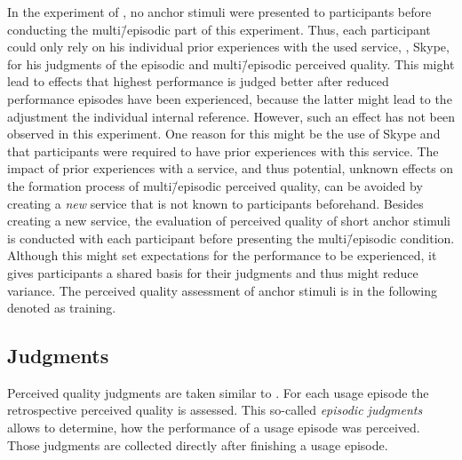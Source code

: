 In the experiment of \citet{moller_single-call_2011}, no anchor stimuli were presented to participants before conducting the multi\=/episodic part of this experiment.
Thus, each participant could only rely on his individual prior experiences with the used service, \ie, Skype, for his judgments of the episodic and multi\=/episodic perceived quality.
This might lead to effects that highest performance is judged better after reduced performance episodes have been experienced, because the latter might lead to the adjustment the individual internal reference.
However, such an effect has not been observed in this experiment.
One reason for this might be the use of Skype and that participants were required to have prior experiences with this service.
The impact of prior experiences with a service, and thus potential, unknown effects on the formation process of multi\=/episodic perceived quality, can be avoided by creating a \emph{new} service that is not known to participants beforehand.
Besides creating a new service, the evaluation of perceived quality of short anchor stimuli is conducted with each participant before presenting the multi\=/episodic condition.
Although this might set expectations for the performance to be experienced, it gives participants a shared basis for their judgments and thus might reduce variance.
The perceived quality assessment of anchor stimuli is in the following denoted as training.


\subsection{Judgments}
Perceived quality judgments are taken similar to \citet{moller_single-call_2011}.
For each usage episode the retrospective perceived quality is assessed.
This so-called \emph{episodic judgments} allows to determine, how the performance of a usage episode was perceived.
Those judgments are collected directly after finishing a usage episode.

